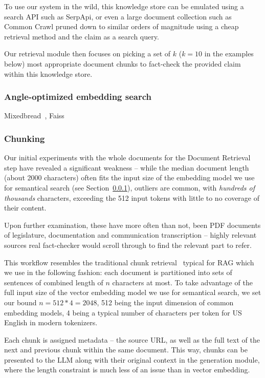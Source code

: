 To use our system in the wild, this knowledge store can be emulated using a search API such as SerpApi, or even a large document collection such as Common Crawl pruned down to similar orders of magnitude using a cheap retrieval method and the claim as a search query.

Our retrieval module then focuses on picking a set of $k$ ($k=10$ in the examples below) most appropriate document chunks to fact-check the provided claim within this knowledge store.

\subsubsection{Angle-optimized embedding search}
\label{sec:knn}
Mixedbread~\cite{li-li-2024-aoe,emb2024mxbai}, Faiss~\cite{douze2024faiss,johnson2019billion}

\subsubsection{Chunking}
Our initial experiments with the whole \averitec{}  documents for the Document Retrieval step have revealed a significant weakness -- while the median document length (about 2000 characters) often fits the input size of the embedding model we use for semantical search (see Section~\ref{sec:knn}), outliers are common, with \textit{hundreds of thousands} characters, exceeding the 512 input tokens with little to no coverage of their content.

Upon further examination, these have more often than not, been PDF documents of legislature, documentation and communication transcription -- highly relevant sources real fact-checker would scroll through to find the relevant part to refer. 

This workflow resembles the traditional chunk retrieval~ typical for RAG which we use in the following fashion: each document is partitioned into sets of sentences of combined length of $n$ characters at most.
To take advantage of the full input size of the vector embedding model we use for semantical search, we set our bound $n=512*4=2048$, 512 being the input dimension of common embedding models, 4 being a typical number of characters per token for US English in modern tokenizers. 

Each chunk is assigned metadata -- the source URL, as well as the full text of the next and previous chunk within the same document.
This way, chunks can be presented to the LLM along with their original context in the generation module, where the length constraint is much less of an issue than in vector embedding.

